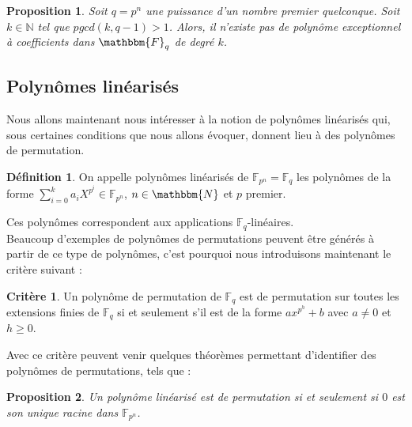 \documentclass[12pt]{article}
\newcommand{\Fq}{\mathbbm{F}_q}
\newtheorem{theorem}{Théorème}
\newtheorem{prop}{Proposition}
\theoremstyle{definition}
\newtheorem{definition}{Définition}
\newtheorem{crit}{Critère}
\begin{document}
\begin{prop}
Soit $q = p^n$ une puissance d'un nombre premier quelconque. Soit $k \in \mathds{N}$ tel que $pgcd(k, q-1) > 1$. Alors, il n'existe pas de polynôme exceptionnel à coefficients dans $\Fq$ de degré $k$.
\end{prop}


\subsection{Polynômes linéarisés}
Nous allons maintenant nous intéresser à la notion de polynômes linéarisés qui, sous certaines conditions que nous allons évoquer, donnent lieu à des polynômes de permutation.\\


\begin{definition}
On appelle polynômes linéarisés de $\mathbb{F}_{p^n} = \mathbb{F}_q$ les polynômes de la forme $\displaystyle \sum_{i=0}^{k} a_iX^{p^i} \in \mathbb{F}_{p^n}$, $n \in \mathbbm{N}$ et $p$ premier.
\end{definition}
Ces polynômes correspondent aux applications $\mathbb{F}_q$-linéaires.\\
Beaucoup d'exemples de polynômes de permutations peuvent être générés à partir de ce type de polynômes, c'est pourquoi nous introduisons maintenant le critère suivant :\\
\begin{crit}
Un polynôme de permutation de $\mathbb{F}_q$ est de permutation sur toutes les extensions finies de $\mathbb{F}_q$ si et seulement s'il est de la forme $ax^{p^h} + b$ avec $a \neq 0$ et $h \geq 0$.
\end{crit}


Avec ce critère peuvent venir quelques théorèmes permettant d'identifier des polynômes de permutations, tels que :
\begin{prop}
Un polynôme linéarisé est de permutation si et seulement si $0$ est son unique racine dans $\mathbb{F}_{p^n}$.
\end{prop}
\end{document}
